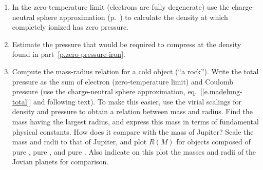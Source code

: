 \begin{exercisebox} 
\begin{enumerate} 
\item\label{p.zero-pressure-iron} In the zero-temperature limit (electrons are fully degenerate) use the charge-neutral sphere approximation (p.~\pageref{e.madelung-total}) to calculate the density at which completely ionized \iron[56] has zero pressure.

\item\label{p.compress-iron} Estimate the pressure that would be required to compress \iron[56] at the density found in part~\ref{p.zero-pressure-iron}.

\item Compute the mass-radius relation for a cold object (``a rock''). Write the total pressure as the sum of electron (zero-temperature limit) and Coulomb pressure (use the charge-neutral sphere approximation, eq.~[\ref{e.madelung-total}] and following text).  To make this easier, use the virial scalings for density and pressure to obtain a relation between mass and radius.  Find the mass having the largest radius, and express this mass in terms of fundamental physical constants.  How does it compare with the mass of Jupiter?  Scale the mass and radii to that of Jupiter, and plot $R(M)$ for objects composed of pure \hydrogen, pure \helium, and pure \carbon.  Also indicate on this plot the masses and radii of the Jovian planets for comparison.

\end{enumerate}
\end{exercisebox}
